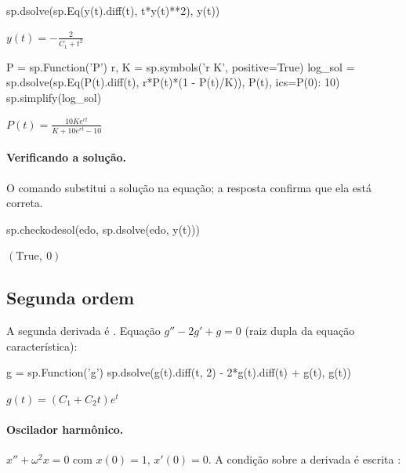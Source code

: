 \begin{entrada}
sp.dsolve(sp.Eq(y(t).diff(t), t*y(t)**2), y(t))
\end{entrada}
\begin{saidamat}
$\displaystyle y{\left(t \right)} = - \frac{2}{C_{1} + t^{2}}$
\end{saidamat}

\begin{entrada}
P = sp.Function('P')
r, K = sp.symbols('r K', positive=True)
log_sol = sp.dsolve(sp.Eq(P(t).diff(t), r*P(t)*(1 - P(t)/K)), P(t), ics={P(0): 10})
sp.simplify(log_sol)
\end{entrada}
\begin{saidamat}
$\displaystyle P{\left(t \right)} = \frac{10 K e^{r t}}{K + 10 e^{r t} - 10}$
\end{saidamat}

\paragraph{Verificando a solução.} O comando  substitui a solução na equação; a resposta
 confirma que ela está correta.

\begin{entrada}
sp.checkodesol(edo, sp.dsolve(edo, y(t)))
\end{entrada}
\begin{saidamat}
$\displaystyle \left( \text{True}, \  0\right)$
\end{saidamat}

\subsection{Segunda ordem}

A segunda derivada é . Equação $g''-2g'+g=0$ (raiz dupla da equação característica):

\begin{entrada}
g = sp.Function('g')
sp.dsolve(g(t).diff(t, 2) - 2*g(t).diff(t) + g(t), g(t))
\end{entrada}
\begin{saidamat}
$\displaystyle g{\left(t \right)} = \left(C_{1} + C_{2} t\right) e^{t}$
\end{saidamat}

\paragraph{Oscilador harmônico.} $x''+\omega^2x=0$ com $x(0)=1$, $x'(0)=0$. A condição sobre a derivada é escrita
:

